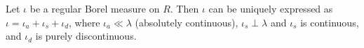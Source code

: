 Let $\iota$ be a regular Borel measure on $R$. Then $\iota$ can be uniquely expressed as $\iota = \iota_a + \iota_s + \iota_d$, where $\iota_a \ll \lambda$ (absolutely continuous), $\iota_s \perp \lambda$ and $\iota_s$ is continuous, and $\iota_d$ is purely discontinuous.

